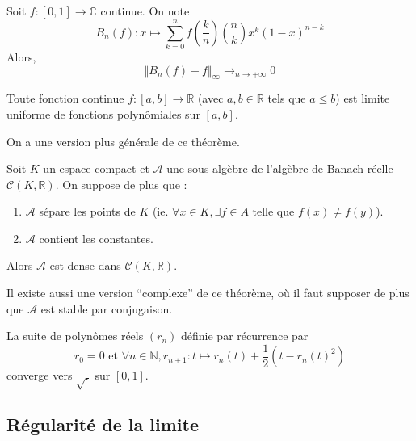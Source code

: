	
	\begin{theorem}[Bernstein]
		Soit $f : [0,1] \rightarrow \mathbb{C}$ continue. On note
		\[ B_n(f) : x \mapsto \sum_{k=0}^{n} f\left(\frac{k}{n}\right) \binom{n}{k} x^k (1-x)^{n-k} \]
		Alors,
		\[ \Vert B_n(f) - f \Vert_\infty \longrightarrow_{n \rightarrow +\infty} 0 \]
	\end{theorem}
	
	
	\begin{corollary}[Weierstrass]
		Toute fonction continue $f : [a,b] \rightarrow \mathbb{R}$ (avec $a, b \in \mathbb{R}$ tels que $a \leq b$) est limite uniforme de fonctions polynômiales sur $[a, b]$.
	\end{corollary}
	
	On a une version plus générale de ce théorème.
	
	
	\begin{theorem}
		Soit $K$ un espace compact et $\mathcal{A}$ une sous-algèbre de l'algèbre de Banach réelle $\mathcal{C}(K, \mathbb{R})$. On suppose de plus que :
		\begin{enumerate}[label=(\roman*)]
			\item $\mathcal{A}$ sépare les points de $K$ (ie. $\forall x \in K, \exists f \in A \text{ telle que } f(x) \neq f(y)$).
			\item $\mathcal{A}$ contient les constantes.
		\end{enumerate}
		Alors $\mathcal{A}$ est dense dans $\mathcal{C}(K, \mathbb{R})$.
	\end{theorem}
	
	\begin{remark}
		Il existe aussi une version ``complexe'' de ce théorème, où il faut supposer de plus que $\mathcal{A}$ est stable par conjugaison.
	\end{remark}
	
	\begin{example}
		La suite de polynômes réels $(r_n)$ définie par récurrence par
		\[ r_0 = 0 \text{ et } \forall n \in \mathbb{N}, r_{n+1} : t \mapsto r_n(t) + \frac{1}{2} (t - r_n(t)^2) \]
		converge vers $\sqrt{.}$ sur $[0,1]$.
	\end{example}
	
	\subsection{Régularité de la limite}
	
